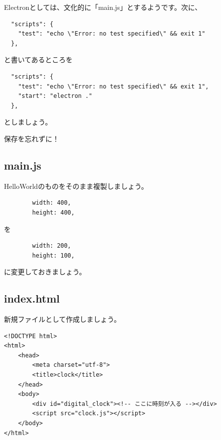 \documentclass[mingoth,11pt,a4j,uplatex]{jsarticle}
\begin{document}
Electronとしては、文化的に「main.js」とするようです。次に、

\begin{verbatim}
  "scripts": {
    "test": "echo \"Error: no test specified\" && exit 1"
  },
\end{verbatim}
と書いてあるところを
\begin{verbatim}
  "scripts": {
    "test": "echo \"Error: no test specified\" && exit 1",
    "start": "electron ."
  },
\end{verbatim}
としましょう。

保存を忘れずに！

\subsection{main.js}
HelloWorldのものをそのまま複製しましょう。

\begin{verbatim}
        width: 400,
        height: 400,
\end{verbatim}
を
\begin{verbatim}
        width: 200,
        height: 100,
\end{verbatim}
に変更しておきましょう。
\subsection{index.html}
新規ファイルとして作成しましょう。
\begin{lstlisting}[caption=DigitalClock：index.html]
<!DOCTYPE html>
<html>
    <head>
        <meta charset="utf-8">
        <title>clock</title>
    </head>
    <body>
        <div id="digital_clock"><!-- ここに時刻が入る --></div>
        <script src="clock.js"></script>
    </body>
</html>
\end{lstlisting}
\end{document}
